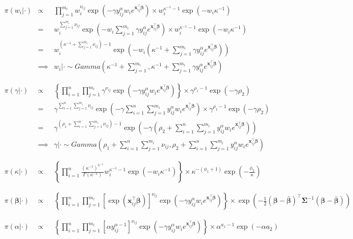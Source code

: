 \documentclass[12pt]{article}
\newcommand{\m}[1]{\mathbf{\bm{#1}}}
\begin{document}
\begin{eqnarray*}
\pi(w_i|\cdot) &\propto& \prod_{j=1}^{m_i} w_i^{\nu_{ij}}\exp\left(-\gamma y_{ij}^\alpha w_ie^{\m{x}_{ij}^\top\m{\beta}}\right) \times w_i^{\kappa^{-1}-1}\exp(-w_i\kappa^{-1}) \\
&=& w_i^{\sum_{j=1}^{m_i}\nu_{ij}}\exp\left(-w_i \sum_{j=1}^{m_i}\gamma y_{ij}^\alpha e^{\m{x}_{ij}^\top\m{\beta}}\right) \times w_i^{\kappa^{-1}-1}\exp(-w_i\kappa^{-1}) \\
&=& w_i^{(\kappa^{-1}+\sum_{j=1}^{m_i}\nu_{ij})-1}\exp\left(-w_i(\kappa^{-1}+\sum_{j=1}^{m_i}\gamma y_{ij}^\alpha e^{\m{x}_{ij}^\top\m{\beta}})\right) \\
&\implies& w_i|\cdot \sim Gamma\left(\kappa^{-1}+\sum_{j=1}^{m_i}, \kappa^{-1}+\sum_{j=1}^{m_i}\gamma y_{ij}^\alpha e^{\m{x}_{ij}^\top\m{\beta}}\right) \\
\\ \\
\pi(\gamma|\cdot) &\propto& \left\{\prod_{i=1}^n \prod_{j=1}^{m_i} \gamma ^{\nu_{ij}} \exp\left(-\gamma y_{ij}^\alpha w_ie^{\m{x}_{ij}^\top\m{\beta}}\right)\right\} \times \gamma^{\rho_1-1}\exp(-\gamma\rho_2) \\
 &=& \gamma^{\sum_{i=1}^n\sum_{j=1}^{m_i}\nu_{ij}} \exp\left(-\gamma \sum_{i=1}^n\sum_{j=1}^{m_i}y_{ij}^\alpha w_ie^{\m{x}_{ij}^\top\m{\beta}}\right) \times \gamma^{\rho_1-1}\exp(-\gamma\rho_2) \\
 &=& \gamma^{(\rho_1+\sum_{i=1}^n\sum_{j=1}^{m_i}\nu_{ij})-1} \exp\left(-\gamma(\rho_2+ \sum_{i=1}^n\sum_{j=1}^{m_i}y_{ij}^\alpha w_ie^{\m{x}_{ij}^\top\m{\beta}})\right) \\
 &\implies& \gamma|\cdot \sim Gamma\left(\rho_1+\sum_{i=1}^n\sum_{j=1}^{m_i}\nu_{ij}, \rho_2+ \sum_{i=1}^n\sum_{j=1}^{m_i}y_{ij}^\alpha w_ie^{\m{x}_{ij}^\top\m{\beta}}\right) \\
\\ \\
\pi(\kappa|\cdot) &\propto& \left\{\prod_{i=1}^n \frac{(\kappa^{-1})^{\kappa^{-1}}}{\Gamma(\kappa^{-1})}w_i^{\kappa^{-1}-1}\exp(-w_i\kappa^{-1})\right\} \times \kappa^{-(\phi_1+1)}\exp\left(-\frac{\phi_2}{\kappa}\right) \\
\\ \\
\pi(\m{\beta}|\cdot) &\propto& \left\{\prod_{i=1}^n \prod_{j=1}^{m_i} \left[\exp(\m{x}_{ij}^\top\m{\beta})\right]^{\nu_{ij}} \exp\left(-\gamma y_{ij}^\alpha w_ie^{\m{x}_{ij}^\top\m{\beta}}\right)\right\} \times \exp\left(-\frac{1}{2}(\m{\beta}-\bar{\m{\beta}})^\top\m{\Sigma}^{-1}(\m{\beta}-\bar{\m{\beta}})\right) \\
\\ \\
\pi(\alpha|\cdot) &\propto& \left\{\prod_{i=1}^n \prod_{j=1}^{m_i} \left[\alpha y_{ij}^{\alpha-1}\right]^{\nu_{ij}} \exp\left(-\gamma y_{ij}^\alpha w_ie^{\m{x}_{ij}^\top\m{\beta}}\right)\right\} \times \alpha^{a_1-1}\exp(-\alpha a_2)
\end{eqnarray*}
\bigskip
\end{document}

